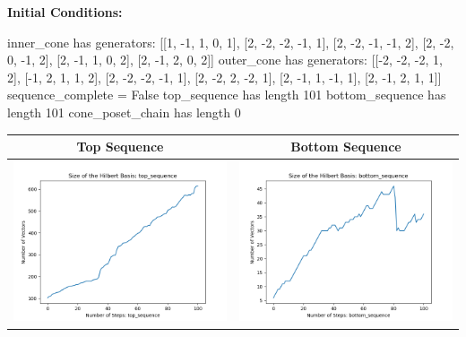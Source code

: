 \documentclass[10pt]{article}
\begin{document}
\textbf{Initial Conditions:}
\begin{SAGE}
inner_cone has generators: 
[[1, -1, 1, 0, 1], [2, -2, -2, -1, 1], [2, -2, -1, -1, 2], [2, -2, 0, -1, 2], [2, -1, 1, 0, 2], [2, -1, 2, 0, 2]]
outer_cone has generators: 
[[-2, -2, -2, 1, 2], [-1, 2, 1, 1, 2], [2, -2, -2, -1, 1], [2, -2, 2, -2, 1], [2, -1, 1, -1, 1], [2, -1, 2, 1, 1]]
	sequence_complete = False
	top_sequence has length 101
	bottom_sequence has length 101
	cone_poset_chain has length 0

\end{SAGE}
\begin{tabular}{c|c}
\textbf{Top Sequence} & \textbf{Bottom Sequence} \\ \hline 
\begin{minipage}{.45\textwidth}
\includegraphics[width=\textwidth]{"DATA/5d/6 generators 2 bound A alternating/top_sequence SIZE"}
\end{minipage} &
\begin{minipage}{.45\textwidth}
\includegraphics[width=\textwidth]{"DATA/5d/6 generators 2 bound A alternating/bottom_sequence SIZE"}

\end{minipage}
\end{tabular}
\end{document}
